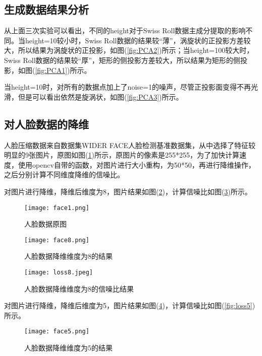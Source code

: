 \documentclass{hitreport}
\begin{document}
\subsection{生成数据结果分析}

从上面三次实验可以看出，不同的height对于Swiss Roll数据主成分提取的影响不同。当height=10较小时，Swiss Roll数据的结果较“薄”，涡旋状的正投影方差较大，所以结果为涡旋状的正投影，如图(\ref{fig:PCA2})所示；当height=100较大时，Swiss Roll数据的结果较“厚”，矩形的侧投影方差较大，所以结果为矩形的侧投影，如图(\ref{fig:PCA1})所示。

当height=10时，对所有的数据点加上了noise=1的噪声，尽管正投影面变得不再光滑，但是可以看出依然是旋涡状，如图(\ref{fig:PCA3})所示。

\subsection{对人脸数据的降维}

人脸压缩数据来自数据集WIDER FACE人脸检测基准数据集，从中选择了特征较明显的9张图片，原图如图(\ref{fig:face1})所示，原图片的像素是255*255，为了加快计算速度，使用opencv自带的函数，对图片进行大小重构，为50*50，再进行降维操作，之后分别计算不同维度降维的信噪比。

对图片进行降维，降维后维度为8，图片结果如图(\ref{fig:face8})，计算信噪比如图(\ref{fig:loss8})所示。

\begin{figure}[htb]
	\centering
	\texttt{[image: face1.png]}
	\caption{人脸数据原图}
	\label{fig:face1}
\end{figure}

\begin{figure}[htb]
	\centering
	\texttt{[image: face8.png]}
	\caption{人脸数据降维维度为8的结果}
	\label{fig:face8}
\end{figure}

\begin{figure}[htb]
	\centering
	\texttt{[image: loss8.jpeg]}
	\caption{人脸数据降维维度为8的信噪比结果}
	\label{fig:loss8}
\end{figure}

对图片进行降维，降维后维度为5，图片结果如图(\ref{fig:face5})，计算信噪比如图(\ref{fig:loss5})所示。

\begin{figure}[htb]
	\centering
	\texttt{[image: face5.png]}
	\caption{人脸数据降维维度为5的结果}
	\label{fig:face5}
\end{figure}
\end{document}
